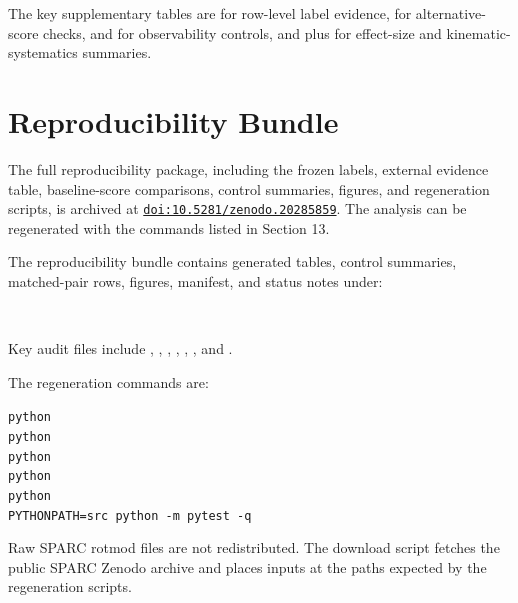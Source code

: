 \documentclass[11pt]{article}
\begin{document}
The key supplementary tables are  for row-level label evidence,  for alternative-score checks,  and  for observability controls, and  plus  for effect-size and kinematic-systematics summaries.

\section{Reproducibility Bundle}
The full reproducibility package, including the frozen labels, external evidence table, baseline-score comparisons, control summaries, figures, and regeneration scripts, is archived at \href{https://doi.org/10.5281/zenodo.20285859}{\nolinkurl{doi:10.5281/zenodo.20285859}}. The analysis can be regenerated with the commands listed in Section 13.

The reproducibility bundle contains generated tables, control summaries, matched-pair rows, figures, manifest, and status notes under:

\begin{flushleft}
\footnotesize
{}\\
\end{flushleft}
Key audit files include , , , , , , and .

The regeneration commands are:

\begin{flushleft}
\footnotesize
\texttt{python} \\
\texttt{python} \\
\texttt{python} \\
\texttt{python} \\
\texttt{python} \\
\texttt{PYTHONPATH=src python -m pytest -q}\\
\end{flushleft}
Raw SPARC rotmod files are not redistributed. The download script fetches the public SPARC Zenodo archive and places inputs at the paths expected by the regeneration scripts.
\end{document}

